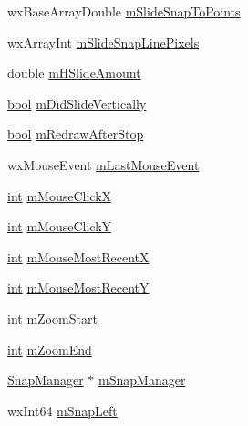 \begin{DoxyCompactItemize}
\item 
wx\+Base\+Array\+Double \hyperlink{class_track_panel_a7068bd24d1e8c6fb60ca3b21cf918a8d}{m\+Slide\+Snap\+To\+Points}
\item 
wx\+Array\+Int \hyperlink{class_track_panel_a3e1c2d2da99cc15060db22e2e07bd8ee}{m\+Slide\+Snap\+Line\+Pixels}
\item 
double \hyperlink{class_track_panel_a120c208ec3fc115a2ce631120f2398b1}{m\+H\+Slide\+Amount}
\item 
\hyperlink{mac_2config_2i386_2lib-src_2libsoxr_2soxr-config_8h_abb452686968e48b67397da5f97445f5b}{bool} \hyperlink{class_track_panel_ab732e997531f9dbf44e50e8f97eda6ee}{m\+Did\+Slide\+Vertically}
\item 
\hyperlink{mac_2config_2i386_2lib-src_2libsoxr_2soxr-config_8h_abb452686968e48b67397da5f97445f5b}{bool} \hyperlink{class_track_panel_ad93db3f8c1d1e4460292b4ebc9bdffad}{m\+Redraw\+After\+Stop}
\item 
wx\+Mouse\+Event \hyperlink{class_track_panel_a5979c1a1b36df3e78c7974e0dfc07c02}{m\+Last\+Mouse\+Event}
\item 
\hyperlink{xmltok_8h_a5a0d4a5641ce434f1d23533f2b2e6653}{int} \hyperlink{class_track_panel_ad1b0688c67fc8193b1424ebf050ca138}{m\+Mouse\+ClickX}
\item 
\hyperlink{xmltok_8h_a5a0d4a5641ce434f1d23533f2b2e6653}{int} \hyperlink{class_track_panel_a18c3e3324891b40b39724a2d010a4331}{m\+Mouse\+ClickY}
\item 
\hyperlink{xmltok_8h_a5a0d4a5641ce434f1d23533f2b2e6653}{int} \hyperlink{class_track_panel_a2b9d69055e7480fd704146b70509f790}{m\+Mouse\+Most\+RecentX}
\item 
\hyperlink{xmltok_8h_a5a0d4a5641ce434f1d23533f2b2e6653}{int} \hyperlink{class_track_panel_abfab1d7c9b5b41de69c41e03a826dc12}{m\+Mouse\+Most\+RecentY}
\item 
\hyperlink{xmltok_8h_a5a0d4a5641ce434f1d23533f2b2e6653}{int} \hyperlink{class_track_panel_ad4dd4fe2eed8b7d44af502c2d3c75b57}{m\+Zoom\+Start}
\item 
\hyperlink{xmltok_8h_a5a0d4a5641ce434f1d23533f2b2e6653}{int} \hyperlink{class_track_panel_abd83a1e090f84770b6978fa7c56e6567}{m\+Zoom\+End}
\item 
\hyperlink{class_snap_manager}{Snap\+Manager} $\ast$ \hyperlink{class_track_panel_abf9ccf015613749c193cace9fae8c37d}{m\+Snap\+Manager}
\item 
wx\+Int64 \hyperlink{class_track_panel_a0fe446f7edd6b6638822a8348e000f07}{m\+Snap\+Left}
\item 

\end{DoxyCompactItemize}
